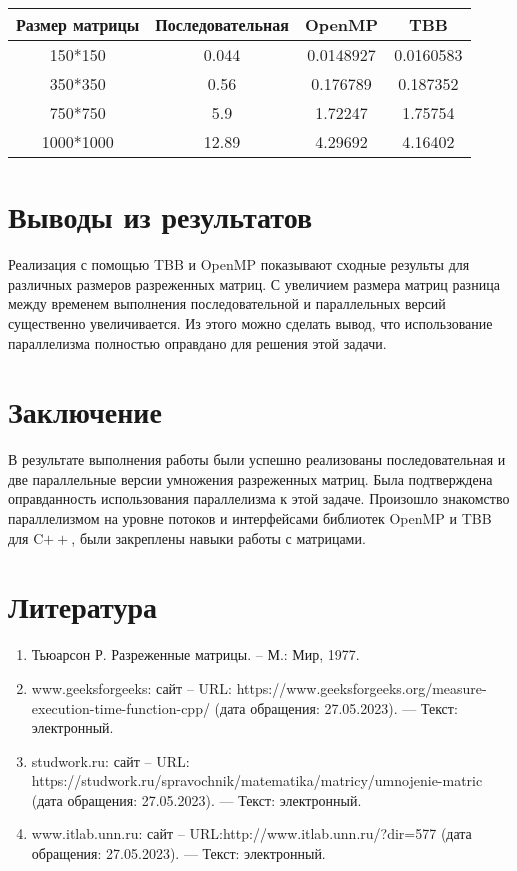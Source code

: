 \documentclass[14pt, russian]{extarticle}
\begin{document}
	\begin{table}[ht]
		\centering
		\begin{tabular}{| c | c | c | c |}
			\hline
			Размер матрицы & Последовательная & OpenMP & TBB \\
			\hline
			150*150 & 0.044 & 0.0148927 & 0.0160583  \\
			\hline
			350*350 & 0.56 &  0.176789 & 0.187352 \\
            \hline
			750*750 & 5.9 &  1.72247 & 1.75754 \\
            \hline
			1000*1000 & 12.89 &  4.29692 & 4.16402 \\
			\hline
		\end{tabular}
	\end{table}
	
 \newpage
 
	\section{Выводы из результатов}
    
    \indent Реализация с помощью TBB и OpenMP показывают сходные результы для различных размеров разреженных матриц. С увеличием размера матриц разница между временем выполнения последовательной и параллельных версий существенно увеличивается. Из этого можно сделать вывод, что использование параллелизма полностью оправдано для решения этой задачи.
    
	\newpage
	
	\section{Заключение}
	В результате выполнения работы были успешно реализованы  последовательная и две параллельные версии умножения разреженных матриц. Была подтверждена оправданность использования параллелизма к этой задаче. Произошло знакомство параллелизмом на уровне потоков и интерфейсами библиотек OpenMP и TBB для C$++$, были закреплены навыки работы с матрицами.
	\newpage
	
	\section{Литература}
	\begin{enumerate}
        \item Тьюарсон Р. Разреженные матрицы. – М.: Мир, 1977.
		\item www.geeksforgeeks: сайт – URL: https://www.geeksforgeeks.org/measure-execution-time-function-cpp/ (дата обращения: 27.05.2023). —  Текст: электронный.
        \item studwork.ru: сайт – URL: https://studwork.ru/spravochnik/matematika/matricy/umnojenie-matric (дата обращения: 27.05.2023). —  Текст: электронный.
        \item www.itlab.unn.ru: сайт – URL:http://www.itlab.unn.ru/?dir=577 (дата обращения: 27.05.2023). —  Текст: электронный.
	\end{enumerate}
	\newpage
	
\end{document}
